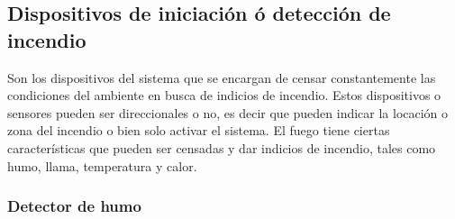 \subsection{Dispositivos de iniciación ó detección de incendio}


Son los dispositivos del sistema que se encargan de censar constantemente las condiciones del ambiente en busca de indicios de incendio. Estos dispositivos o sensores pueden ser direccionales o no, es decir que pueden indicar la locación o zona del incendio o bien solo activar el sistema. El fuego tiene ciertas características que pueden ser censadas y dar indicios de incendio, tales como humo, llama, temperatura y calor. 


\subsubsection{Detector de humo}







